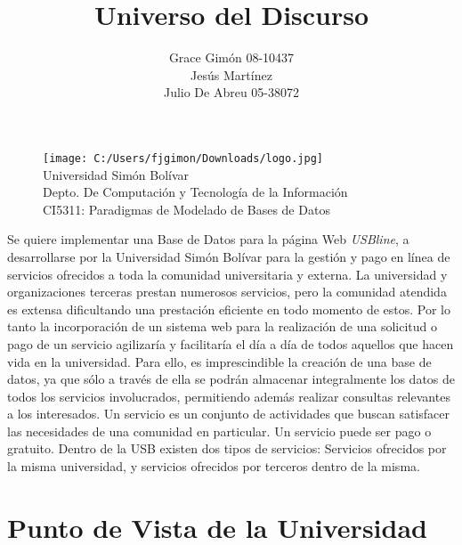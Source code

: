 \documentclass[12pt,a4paper,spanish]{article}
\begin{document}
\begin{figure}
  \centering
    \texttt{[image: C:/Users/fjgimon/Downloads/logo.jpg]}
     \\ Universidad Sim\'on Bol\'ivar
     \\ Depto. De Computaci\'on y Tecnolog\'ia de la Informaci\'on
     \\ CI5311: Paradigmas de Modelado de Bases de Datos
\end{figure} 

\title{Universo del Discurso}
\author{Grace Gim\'on 08-10437 \\
        Jes\'us Mart\'inez \\
        Julio De Abreu 05-38072}

\maketitle

\newpage

\indent Se quiere implementar una Base de Datos para la p\'agina Web
\emph{USBline}, a desarrollarse por la Universidad Sim\'on Bol\'ivar
para la gesti\'on y pago en l\'inea de servicios ofrecidos a toda la
comunidad universitaria y externa.
\newline
\newline
\indent La universidad y organizaciones terceras prestan numerosos servicios, pero la comunidad atendida es extensa
 dificultando una prestaci\'on eficiente en todo momento de estos. Por lo tanto la 
incorporaci\'on de un sistema web para la realizaci\'on de una solicitud o pago de un servicio 
agilizar\'ia y facilitar\'ia el d\'ia a d\'ia de todos aquellos que hacen vida 
en la universidad. Para ello, es imprescindible la creaci\'on de una base de datos, 
ya que s\'olo a trav\'es de ella se podr\'an almacenar integralmente los
datos de todos los servicios involucrados, permitiendo adem\'as realizar consultas relevantes
a los interesados.
\newline
\newline
\indent Un servicio es un conjunto de actividades que buscan
satisfacer las necesidades de una comunidad en particular. Un servicio
puede ser pago o gratuito. Dentro de la USB existen dos tipos de
servicios: Servicios ofrecidos por la misma universidad, y servicios
ofrecidos por terceros dentro de la misma.

\section{Punto de Vista de la Universidad}
\end{document}
